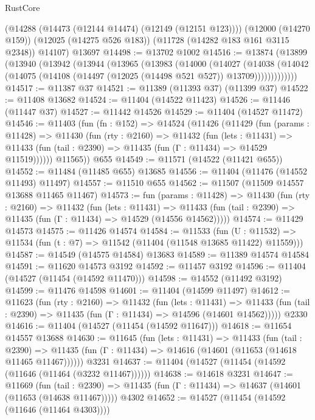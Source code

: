 \begin{lexlean}{RustCore}
\begin{coremodule}
      (@14288 (@14473 (@12144 @14474) (@12149 (@12151 @123))))
      (@12000 (@14270 @159))
      (@12025 (@14275 @526 @183))
      (@11728 (@14282 @183 @161 @3115 @2348))
      @14107)
    @13697
@14498 := @13702 @1002
@14516 := @13874
    (@13899
      (@13940
        (@13942
          (@13944
            (@13965
              (@13983
                (@14000
                  (@14027
                    (@14038
                      (@14042
                        (@14075 (@14108 (@14497 (@12025 (@14498 @521 @527)) @13709)))))))))))))
@14517 := @11387 @37
@14521 := @11389 (@11393 @37) (@11399 @37)
@14522 := @11408 @13682
@14524 := @11404 (@14522 @11423)
@14526 := @11446 (@11447 @37)
@14527 := @11442 @14526
@14529 := @11404 (@14527 @11472)
@14546 := @11403
    (fun (fn : @152) =>
    @14524
      (@11426
        (@11429
          (fun (params : @11428) =>
          @11430
            (fun (rty : @2160) =>
            @11432
              (fun (lets : @11431) =>
              @11433 (fun (tail : @2390) => @11435 (fun (Γ : @11434) => @14529 @11519))))))
        @11565))
    @655
@14549 := @11571 (@14522 (@11421 @655))
@14552 := @11484 (@11485 @655) @13685
@14556 := @11404 (@11476 (@14552 @11493) @11497)
@14557 := @11510 @655
@14562 := @11507 (@11509 @14557 @13688 @11465 @11467)
@14573 := fun (params : @11428) =>
  @11430
    (fun (rty : @2160) =>
    @11432
      (fun (lets : @11431) =>
      @11433 (fun (tail : @2390) => @11435 (fun (Γ : @11434) => @14529 (@14556 @14562)))))
@14574 := @11429 @14573
@14575 := @11426 @14574
@14584 := @11533
    (fun (U : @11532) => @11534 (fun (t : @7) => @11542 (@11404 (@11548 @13685 @11422) @11559)))
@14587 := @14549 (@14575 @14584) @13683
@14589 := @11389 @14574 @14584
@14591 := @11620 @14573 @3192
@14592 := @11457 @3192
@14596 := @11404 (@14527 (@11454 (@14592 @11470)))
@14598 := @14552 (@11492 @3192)
@14599 := @11476 @14598
@14601 := @11404 (@14599 @11497)
@14612 := @11623
    (fun (rty : @2160) =>
    @11432
      (fun (lets : @11431) =>
      @11433 (fun (tail : @2390) => @11435 (fun (Γ : @11434) => @14596 (@14601 @14562)))))
    @2330
@14616 := @11404 (@14527 (@11454 (@14592 @11647)))
@14618 := @11654 @14557 @13688
@14630 := @11645
    (fun (lets : @11431) =>
    @11433
      (fun (tail : @2390) =>
      @11435 (fun (Γ : @11434) => @14616 (@14601 (@11653 (@14618 @11465 @11467))))))
    @3231
@14637 := @11404 (@14527 (@11454 (@14592 (@11646 (@11464 (@3232 @11467))))))
@14638 := @14618 @3231
@14647 := @11669
    (fun (tail : @2390) => @11435 (fun (Γ : @11434) => @14637 (@14601 (@11653 (@14638 @11467)))))
    @4302
@14652 := @14527 (@11454 (@14592 (@11646 (@11464 @4303))))

\end{coremodule}
\end{lexlean}
